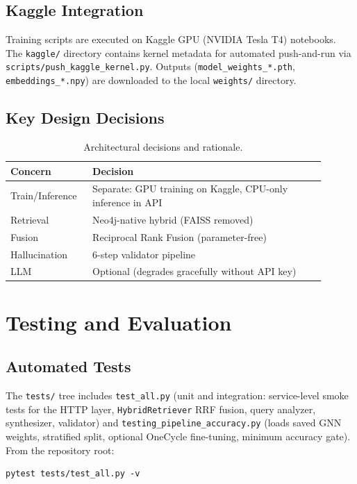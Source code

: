 \documentclass[conference]{IEEEtran}
\begin{document}
\subsection{Kaggle Integration}
Training scripts are executed on Kaggle GPU (NVIDIA Tesla T4) notebooks. The \texttt{kaggle/} directory contains kernel metadata for automated push-and-run via \texttt{scripts/push\_kaggle\_kernel.py}. Outputs (\texttt{model\_weights\_*.pth}, \texttt{embeddings\_*.npy}) are downloaded to the local \texttt{weights/} directory.

\subsection{Key Design Decisions}

\begin{table}[t]
\centering
\caption{Architectural decisions and rationale.}
\label{tab:decisions}
\begin{tabular}{@{}p{0.22\linewidth} p{0.68\linewidth}@{}}
\toprule
Concern & Decision \\
\midrule
Train/Inference & Separate: GPU training on Kaggle, CPU-only inference in API \\
Retrieval & Neo4j-native hybrid (FAISS removed) \\
Fusion & Reciprocal Rank Fusion (parameter-free) \\
Hallucination & 6-step validator pipeline \\
LLM & Optional (degrades gracefully without API key) \\
\bottomrule
\end{tabular}
\end{table}

\section{Testing and Evaluation}

\subsection{Automated Tests}
The \texttt{tests/} tree includes \texttt{test\_all.py} (unit and integration: service-level smoke tests for the HTTP layer, \texttt{HybridRetriever} RRF fusion, query analyzer, synthesizer, validator) and \texttt{testing\_pipeline\_accuracy.py} (loads saved GNN weights, stratified split, optional OneCycle fine-tuning, minimum accuracy gate). From the repository root:
\begin{verbatim}
pytest tests/test_all.py -v
\end{verbatim}
\end{document}

